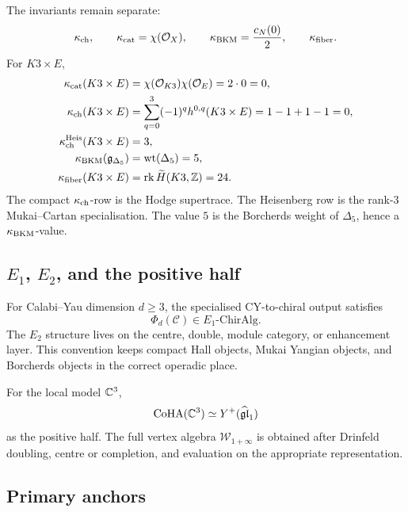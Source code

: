 The invariants remain separate:
\[
  \kappa_{\mathrm{ch}},\qquad
  \kappa_{\mathrm{cat}}=\chi(\mathcal O_X),\qquad
  \kappa_{\mathrm{BKM}}=\frac{c_N(0)}{2},\qquad
  \kappa_{\mathrm{fiber}} .
\]
For \(K3\times E\),
\[
  \begin{aligned}
  \kappa_{\mathrm{cat}}(K3\times E)
  &=
  \chi(\mathcal O_{K3})\chi(\mathcal O_E)
  =
  2\cdot 0
  =
  0,\\
  \kappa_{\mathrm{ch}}(K3\times E)
  &=
  \sum_{q=0}^{3}(-1)^q h^{0,q}(K3\times E)
  =
  1-1+1-1
  =
  0,\\
  \kappa_{\mathrm{ch}}^{\mathrm{Heis}}(K3\times E)
  &=
  3,\\
  \kappa_{\mathrm{BKM}}(\mathfrak{g}_{\Delta_5})
  &=
  \mathrm{wt}(\Delta_5)
  =
  5,\\
  \kappa_{\mathrm{fiber}}(K3\times E)
  &=
  \mathrm{rk}\,\widetilde H(K3,\mathbb{Z})
  =
  24 .
  \end{aligned}
\]
The compact \(\kappa_{\mathrm{ch}}\)-row is the Hodge supertrace.  The Heisenberg row
is the rank-\(3\) Mukai--Cartan specialisation.  The value \(5\) is
the Borcherds weight of \(\Delta_5\), hence a \(\kappa_{\mathrm{BKM}}\)-value.

\subsection*{\(E_1\), \(E_2\), and the positive half}

For Calabi--Yau dimension \(d\geq 3\), the specialised
CY-to-chiral output satisfies
\[
  \Phi_d(\mathcal C)\in E_1\text{-}\mathrm{ChirAlg}.
\]
The \(E_2\) structure lives on the centre, double, module category, or
enhancement layer.  This convention keeps compact Hall objects, Mukai
Yangian objects, and Borcherds objects in the correct operadic place.

For the local model \(\mathbb{C}^3\),
\[
  \mathrm{CoHA}(\mathbb{C}^3)\simeq Y^+(\widehat{\mathfrak{gl}}_1)
\]
as the positive half.  The full vertex algebra
\(\mathcal W_{1+\infty}\) is obtained after Drinfeld doubling, centre
or completion, and evaluation on the appropriate representation.

\subsection*{Primary anchors}

